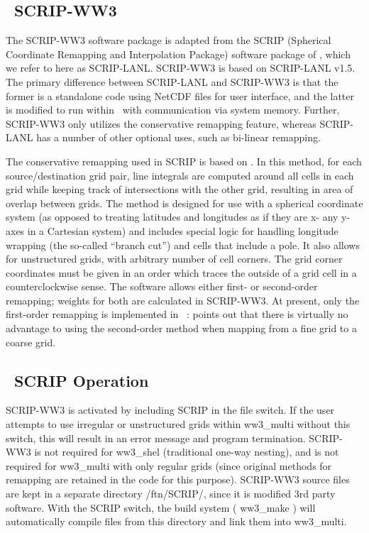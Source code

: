 \vssub
\subsection{~SCRIP-WW3} \label{sec:scripB}
\vssub

The SCRIP-WW3 software package is adapted from the {\F SCRIP} (Spherical
Coordinate Remapping and Interpolation Package) software package of
\cite{man:Jones98}, which we refer to here as SCRIP-LANL. SCRIP-WW3 is based
on SCRIP-LANL v1.5. The primary difference between SCRIP-LANL and SCRIP-WW3 is
that the former is a standalone code using NetCDF files for user interface,
and the latter is modified to run within \ws\, with communication via system
memory. Further, SCRIP-WW3 only utilizes the conservative remapping feature,
whereas SCRIP-LANL has a number of other optional uses, such as bi-linear
remapping.

The conservative remapping used in SCRIP is based on \cite{art:Jones99}. In
this method, for each source/destination grid pair, line integrals are
computed around all cells in each grid while keeping track of intersections
with the other grid, resulting in area of overlap between grids. The method is
designed for use with a spherical coordinate system (as opposed to treating
latitudes and longitudes as if they are x- any y-axes in a Cartesian system)
and includes special logic for handling longitude wrapping (the so-called
``branch cut'') and cells that include a pole. It also allows for unstructured
grids, with arbitrary number of cell corners. The grid corner coordinates must
be given in an order which traces the outside of a grid cell in a
counterclockwise sense. The software allows either first- or second-order
remapping; weights for both are calculated in SCRIP-WW3. At present, only the
first-order remapping is implemented in \ws\ : \cite{art:Jones99} points out
that there is virtually no advantage to using the second-order method when
mapping from a fine grid to a coarse grid.

\vssub
\subsection{~SCRIP Operation} \label{sec:scripC}
\vssub

SCRIP-WW3 is activated by including {\F SCRIP} in the file {\file switch}. If
the user attempts to use irregular or unstructured grids within {\file
  ww3\_multi} without this switch, this will result in an error message and
program termination. SCRIP-WW3 is not required for {\file ww3\_shel}
(traditional one-way nesting), and is not required for {\file ww3\_multi} with
only regular grids (since original methods for remapping are retained in the
code for this purpose). SCRIP-WW3 source files are kept in a separate
directory {\file /ftn/SCRIP/}, since it is modified 3rd party software. With
the {\F SCRIP} switch, the build system ( {\file ww3\_make} ) will
automatically compile files from this directory and link them into {\file
  ww3\_multi}.

